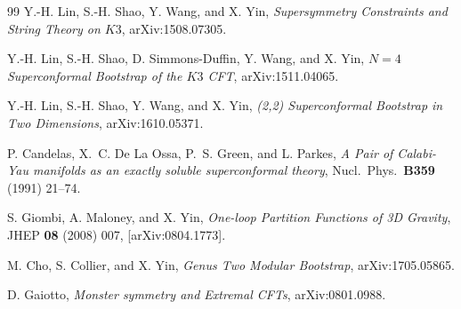 \begin{thebibliography}{99}
 Y.-H. Lin, S.-H. Shao, Y. Wang, and X. Yin, \emph{Supersymmetry Constraints and String Theory on $K3$}, arXiv:1508.07305.

 Y.-H. Lin, S.-H. Shao, D. Simmons-Duffin, Y. Wang, and X. Yin, \emph{$N=4$ Superconformal Bootstrap of the $K3$ CFT}, arXiv:1511.04065.

 Y.-H. Lin, S.-H. Shao, Y. Wang, and X. Yin, \emph{(2,2) Superconformal Bootstrap in Two Dimensions}, arXiv:1610.05371.

 P. Candelas, X.~C. De La Ossa, P.~S. Green, and L. Parkes, \emph{A Pair of Calabi-Yau manifolds as an exactly soluble superconformal theory}, Nucl.\ Phys.\ \textbf{B359} (1991) 21--74.

 S. Giombi, A. Maloney, and X. Yin, \emph{One-loop Partition Functions of 3D Gravity}, JHEP \textbf{08} (2008) 007, [arXiv:0804.1773].

 M. Cho, S. Collier, and X. Yin, \emph{Genus Two Modular Bootstrap}, arXiv:1705.05865.

 D. Gaiotto, \emph{Monster symmetry and Extremal CFTs}, arXiv:0801.0988.

\end{thebibliography}
